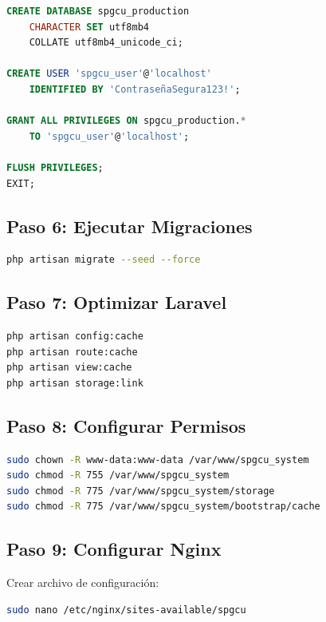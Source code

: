 \documentclass[12pt,a4paper]{article}
\begin{document}
\begin{lstlisting}[language=sql]
CREATE DATABASE spgcu_production 
    CHARACTER SET utf8mb4 
    COLLATE utf8mb4_unicode_ci;

CREATE USER 'spgcu_user'@'localhost' 
    IDENTIFIED BY 'ContraseñaSegura123!';

GRANT ALL PRIVILEGES ON spgcu_production.* 
    TO 'spgcu_user'@'localhost';

FLUSH PRIVILEGES;
EXIT;
\end{lstlisting}

\subsection{Paso 6: Ejecutar Migraciones}
\begin{lstlisting}[language=bash]
php artisan migrate --seed --force
\end{lstlisting}

\subsection{Paso 7: Optimizar Laravel}
\begin{lstlisting}[language=bash]
php artisan config:cache
php artisan route:cache
php artisan view:cache
php artisan storage:link
\end{lstlisting}

\subsection{Paso 8: Configurar Permisos}
\begin{lstlisting}[language=bash]
sudo chown -R www-data:www-data /var/www/spgcu_system
sudo chmod -R 755 /var/www/spgcu_system
sudo chmod -R 775 /var/www/spgcu_system/storage
sudo chmod -R 775 /var/www/spgcu_system/bootstrap/cache
\end{lstlisting}

\subsection{Paso 9: Configurar Nginx}

Crear archivo de configuración:
\begin{lstlisting}[language=bash]
sudo nano /etc/nginx/sites-available/spgcu
\end{lstlisting}
\end{document}
